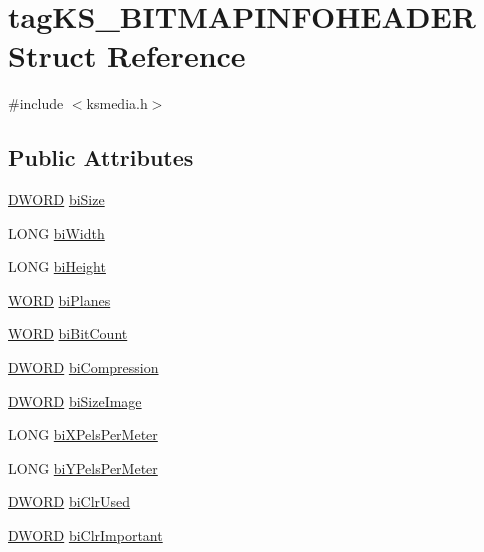 \hypertarget{structtag_k_s___b_i_t_m_a_p_i_n_f_o_h_e_a_d_e_r}{}\section{tag\+K\+S\+\_\+\+B\+I\+T\+M\+A\+P\+I\+N\+F\+O\+H\+E\+A\+D\+ER Struct Reference}
\label{structtag_k_s___b_i_t_m_a_p_i_n_f_o_h_e_a_d_e_r}


{\ttfamily \#include $<$ksmedia.\+h$>$}

\subsection*{Public Attributes}
\begin{DoxyCompactItemize}
\item 
\hyperlink{mapinls_8h_ad342ac907eb044443153a22f964bf0af}{D\+W\+O\+RD} \hyperlink{structtag_k_s___b_i_t_m_a_p_i_n_f_o_h_e_a_d_e_r_af5a16b846a32f014dcb84ca8fae128dc}{bi\+Size}
\item 
L\+O\+NG \hyperlink{structtag_k_s___b_i_t_m_a_p_i_n_f_o_h_e_a_d_e_r_a09ea3577d5759179b4c52dbe3e3cc95d}{bi\+Width}
\item 
L\+O\+NG \hyperlink{structtag_k_s___b_i_t_m_a_p_i_n_f_o_h_e_a_d_e_r_a27992a6e076cc0e595577c117b0d03a7}{bi\+Height}
\item 
\hyperlink{nfilterkit_8h_a7e62930c4614f6a59b33d693f01ce08e}{W\+O\+RD} \hyperlink{structtag_k_s___b_i_t_m_a_p_i_n_f_o_h_e_a_d_e_r_a926d8069eca56ee56b18171865bd1219}{bi\+Planes}
\item 
\hyperlink{nfilterkit_8h_a7e62930c4614f6a59b33d693f01ce08e}{W\+O\+RD} \hyperlink{structtag_k_s___b_i_t_m_a_p_i_n_f_o_h_e_a_d_e_r_ab347122d28fe8e428226c7938eab3ed6}{bi\+Bit\+Count}
\item 
\hyperlink{mapinls_8h_ad342ac907eb044443153a22f964bf0af}{D\+W\+O\+RD} \hyperlink{structtag_k_s___b_i_t_m_a_p_i_n_f_o_h_e_a_d_e_r_a13525348f3d18bdfd751c05be11ed3a0}{bi\+Compression}
\item 
\hyperlink{mapinls_8h_ad342ac907eb044443153a22f964bf0af}{D\+W\+O\+RD} \hyperlink{structtag_k_s___b_i_t_m_a_p_i_n_f_o_h_e_a_d_e_r_a38031d589ee54687e98b70f8763fd1f6}{bi\+Size\+Image}
\item 
L\+O\+NG \hyperlink{structtag_k_s___b_i_t_m_a_p_i_n_f_o_h_e_a_d_e_r_ad4030afda7ee0f687c5c4775d344383d}{bi\+X\+Pels\+Per\+Meter}
\item 
L\+O\+NG \hyperlink{structtag_k_s___b_i_t_m_a_p_i_n_f_o_h_e_a_d_e_r_a54cd17798f1bcb0dc1e378dc963c8a65}{bi\+Y\+Pels\+Per\+Meter}
\item 
\hyperlink{mapinls_8h_ad342ac907eb044443153a22f964bf0af}{D\+W\+O\+RD} \hyperlink{structtag_k_s___b_i_t_m_a_p_i_n_f_o_h_e_a_d_e_r_a64a62cdcf6133ea050330f58e120ec42}{bi\+Clr\+Used}
\item 
\hyperlink{mapinls_8h_ad342ac907eb044443153a22f964bf0af}{D\+W\+O\+RD} \hyperlink{structtag_k_s___b_i_t_m_a_p_i_n_f_o_h_e_a_d_e_r_a477498ba555b81f5123fd2bad7e81047}{bi\+Clr\+Important}
\end{DoxyCompactItemize}


